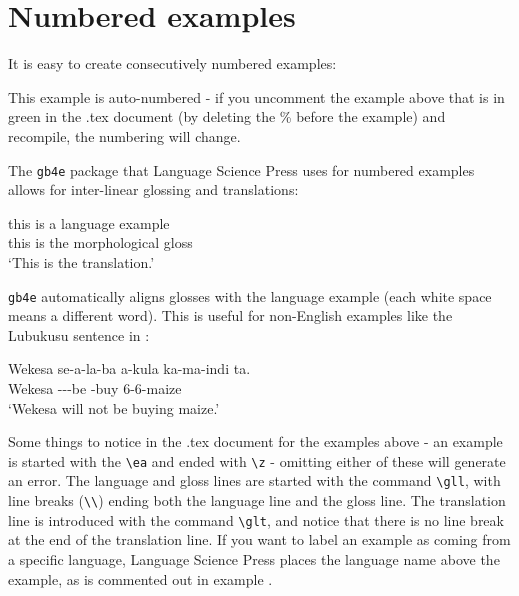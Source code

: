 \documentclass[output=paper,colorlinks,citecolor=brown,
]{langscibook}
\begin{document}
\section{Numbered examples} \label{sec:diercks:NumberedExs}

It is easy to create consecutively numbered examples: 


\ea 
This example is auto-numbered - if you uncomment the example above that is in green in the .tex document (by deleting the \% before the example) and recompile, the numbering will change.
\z 

\noindent The \texttt{gb4e} package that Language Science Press uses for numbered examples allows for inter-linear glossing and translations: 

\ea 
\gll this is a language example \\
this is the morphological gloss \\
\glt `This is the translation.' 
\z 

\noindent  \texttt{gb4e} automatically aligns glosses with the language example (each white space means a different word). This is useful for non-English examples like the Lubukusu sentence in : 

\ea \label{ex:diercks:BukusuNegation}
\gll Wekesa se-a-la-ba a-kula ka-ma-indi ta. \\
Wekesa \Neg-\Sm-\Pst-be \Sm-buy 6-6-maize \Neg{} \\ 
\glt `Wekesa will not be buying maize.'
\z

\noindent Some things to notice in the .tex document for the examples above - an example is started with the \verb|\ea| and ended with \verb|\z| - omitting either of these will generate an error. The language and gloss lines are started with the command \verb|\gll|, with line breaks (\verb|\\|) ending both the language line and the gloss line. The translation line is introduced with the command \verb|\glt|, and notice that there is no line break at the end of the translation line. If you want to label an example as coming from a specific language, Language Science Press places the language name above the example, as is commented out in example .
\end{document}
